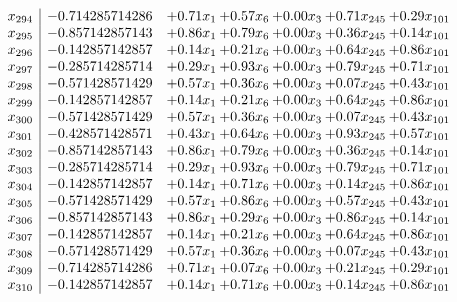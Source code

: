 \documentclass[8pt]{article}
\begin{document}
\[\begin{array}{c| c c@{\hskip 2pt} c@{\hskip 2pt} c@{\hskip 2pt} c@{\hskip 2pt} c@{\hskip 2pt} }
 x_{294}   &  -0.714285714286 & +  0.71 x_{1} & +  0.57 x_{6} & +  0.00 x_{3} & +  0.71 x_{245} & +  0.29 x_{101}\\
 x_{295}   &  -0.857142857143 & +  0.86 x_{1} & +  0.79 x_{6} & +  0.00 x_{3} & +  0.36 x_{245} & +  0.14 x_{101}\\
 x_{296}   &  -0.142857142857 & +  0.14 x_{1} & +  0.21 x_{6} & +  0.00 x_{3} & +  0.64 x_{245} & +  0.86 x_{101}\\
 x_{297}   &  -0.285714285714 & +  0.29 x_{1} & +  0.93 x_{6} & +  0.00 x_{3} & +  0.79 x_{245} & +  0.71 x_{101}\\
 x_{298}   &  -0.571428571429 & +  0.57 x_{1} & +  0.36 x_{6} & +  0.00 x_{3} & +  0.07 x_{245} & +  0.43 x_{101}\\
 x_{299}   &  -0.142857142857 & +  0.14 x_{1} & +  0.21 x_{6} & +  0.00 x_{3} & +  0.64 x_{245} & +  0.86 x_{101}\\
 x_{300}   &  -0.571428571429 & +  0.57 x_{1} & +  0.36 x_{6} & +  0.00 x_{3} & +  0.07 x_{245} & +  0.43 x_{101}\\
 x_{301}   &  -0.428571428571 & +  0.43 x_{1} & +  0.64 x_{6} & +  0.00 x_{3} & +  0.93 x_{245} & +  0.57 x_{101}\\
 x_{302}   &  -0.857142857143 & +  0.86 x_{1} & +  0.79 x_{6} & +  0.00 x_{3} & +  0.36 x_{245} & +  0.14 x_{101}\\
 x_{303}   &  -0.285714285714 & +  0.29 x_{1} & +  0.93 x_{6} & +  0.00 x_{3} & +  0.79 x_{245} & +  0.71 x_{101}\\
 x_{304}   &  -0.142857142857 & +  0.14 x_{1} & +  0.71 x_{6} & +  0.00 x_{3} & +  0.14 x_{245} & +  0.86 x_{101}\\
 x_{305}   &  -0.571428571429 & +  0.57 x_{1} & +  0.86 x_{6} & +  0.00 x_{3} & +  0.57 x_{245} & +  0.43 x_{101}\\
 x_{306}   &  -0.857142857143 & +  0.86 x_{1} & +  0.29 x_{6} & +  0.00 x_{3} & +  0.86 x_{245} & +  0.14 x_{101}\\
 x_{307}   &  -0.142857142857 & +  0.14 x_{1} & +  0.21 x_{6} & +  0.00 x_{3} & +  0.64 x_{245} & +  0.86 x_{101}\\
 x_{308}   &  -0.571428571429 & +  0.57 x_{1} & +  0.36 x_{6} & +  0.00 x_{3} & +  0.07 x_{245} & +  0.43 x_{101}\\
 x_{309}   &  -0.714285714286 & +  0.71 x_{1} & +  0.07 x_{6} & +  0.00 x_{3} & +  0.21 x_{245} & +  0.29 x_{101}\\
 x_{310}   &  -0.142857142857 & +  0.14 x_{1} & +  0.71 x_{6} & +  0.00 x_{3} & +  0.14 x_{245} & +  0.86 x_{101}\\

\end{array}\]
\end{document}
